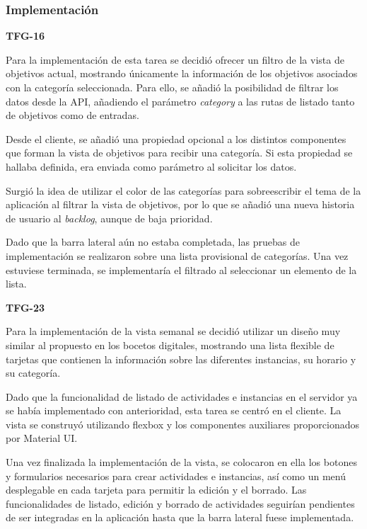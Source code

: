 \documentclass[10pt, a4paper]{aqademic}
\begin{document}
\subsubsection{Implementación}

\textbf{TFG-16}

Para la implementación de esta tarea se decidió ofrecer un filtro de la vista de objetivos actual, mostrando únicamente la información de los objetivos asociados con la categoría seleccionada. Para ello, se añadió la posibilidad de filtrar los datos desde la API, añadiendo el parámetro \textit{category} a las rutas de listado tanto de objetivos como de entradas.

Desde el cliente, se añadió una propiedad opcional a los distintos componentes que forman la vista de objetivos para recibir una categoría. Si esta propiedad se hallaba definida, era enviada como parámetro al solicitar los datos. 

Surgió la idea de utilizar el color de las categorías para sobreescribir el tema de la aplicación al filtrar la vista de objetivos, por lo que se añadió una nueva historia de usuario al \textit{backlog}, aunque de baja prioridad.

Dado que la barra lateral aún no estaba completada, las pruebas de implementación se realizaron sobre una lista provisional de categorías. Una vez estuviese terminada, se implementaría el filtrado al seleccionar un elemento de la lista.

\medskip

\textbf{TFG-23}

Para la implementación de la vista semanal se decidió utilizar un diseño muy similar al propuesto en los bocetos digitales, mostrando una lista flexible de tarjetas que contienen la información sobre las diferentes instancias, su horario y su categoría. 

Dado que la funcionalidad de listado de actividades e instancias en el servidor ya se había implementado con anterioridad, esta tarea se centró en el cliente. La vista se construyó utilizando flexbox \cite{noauthor_flexbox_nodate} y los componentes auxiliares proporcionados por Material UI.

Una vez finalizada la implementación de la vista, se colocaron en ella los botones y formularios necesarios para crear actividades e instancias, así como un menú desplegable en cada tarjeta para permitir la edición y el borrado. Las funcionalidades de listado, edición y borrado de actividades seguirían pendientes de ser integradas en la aplicación hasta que la barra lateral fuese implementada.
\end{document}
